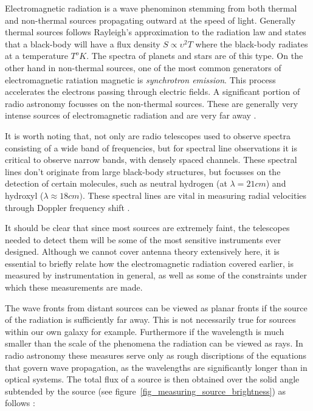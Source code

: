 \documentclass[a4paper,10pt]{report}
\begin{document}
Electromagnetic radiation is a wave phenominon stemming from both thermal and non-thermal sources propagating outward at the speed of light. Generally thermal sources follows Rayleigh's approximation to the radiation 
law and states that a black-body will have a flux density $S\propto \upsilon^2T$ where the black-body radiates at a temperature $T^oK$. The spectra of planets and stars are of this type. On the other hand in non-thermal 
sources, one of the most common generators of electromagnetic ratiation magnetic is \textit{synchrotron emission}. This process accelerates the electrons passing through electric fields. A significant portion of radio 
astronomy focusses on the non-thermal sources. These are generally very intense sources of electromagnetic radiation and are very far away \cite{christiansenradiotelescopes}.

It is worth noting that, not only are radio telescopes used to observe spectra consisting of a wide band of frequencies, but for spectral line observations it is critical to observe narrow bands, with densely spaced channels. 
These spectral lines don't originate from large black-body structures, but focusses on the detection of certain molecules, such as neutral hydrogen (at $\lambda = 21 cm$) and
hydroxyl ($\lambda \approx 18 cm)$. These spectral lines are vital in measuring radial velocities through Doppler frequency shift \cite{christiansenradiotelescopes,taylor1999synthesis}.

It should be clear that since most sources are extremely faint, the telescopes needed to detect them will be some of the most sensitive instruments ever designed. Although we cannot
cover antenna theory extensively here, it is essential to briefly relate how the electromagnetic radiation covered earlier, is measured by instrumentation in general, as well as some of the constraints under which
these measurements are made.

The wave fronts from distant sources can be viewed as planar fronts if the source of the radiation is sufficiently far away. This is not necessarily true for sources within our own galaxy for example. Furthermore 
if the wavelength is much smaller than the scale of the phenomena the radiation can be viewed as rays. In radio astronomy these measures serve only as rough discriptions of the 
equations that govern wave propagation, as the wavelengths are significantly longer than in optical systems.  The total flux of a source is then obtained over the solid angle subtended by the 
source (see figure~\ref{fig_measuring_source_brightness}) as follows \cite{wilson2009tools}:
\end{document}
